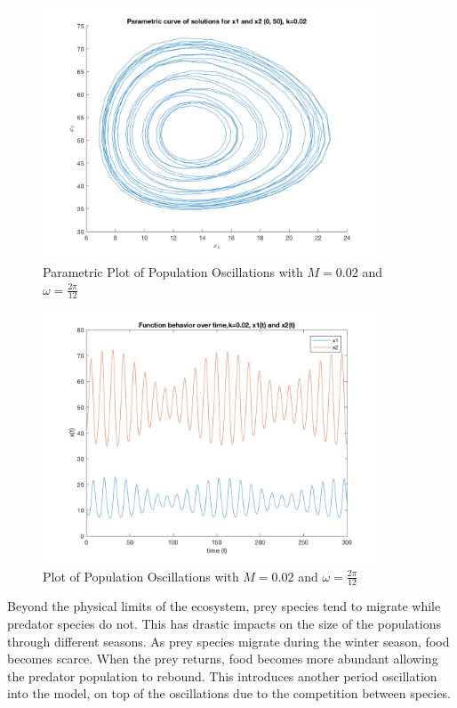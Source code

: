 \documentclass[12pt]{article}   %
\theoremstyle{definition}
\numberwithin{equation}{section}
\begin{document}
\begin{figure} [h] 
  \centering
    \includegraphics[width=10cm]{images/circM.png}
  \caption{Parametric Plot of Population Oscillations with $M=0.02$ and $\omega=\frac{2\pi}{12}$}
  \label{fig:circM}
\end{figure}

\begin{figure} [h] 
  \centering
    \includegraphics[width=10cm]{images/updownM.png}
  \caption{Plot of Population Oscillations with $M=0.02$ and $\omega=\frac{2\pi}{12}$}
  \label{fig:updownM}
\end{figure}

\quad Beyond the physical limits of the ecosystem, prey species tend to migrate while predator species do not. This has drastic impacts on the size of the populations through different seasons. As prey species migrate during the winter season, food becomes scarce. When the prey returns, food becomes more abundant allowing the predator population to rebound. This introduces another period oscillation into the model, on top of the oscillations due to the competition between species.  
\end{document}
